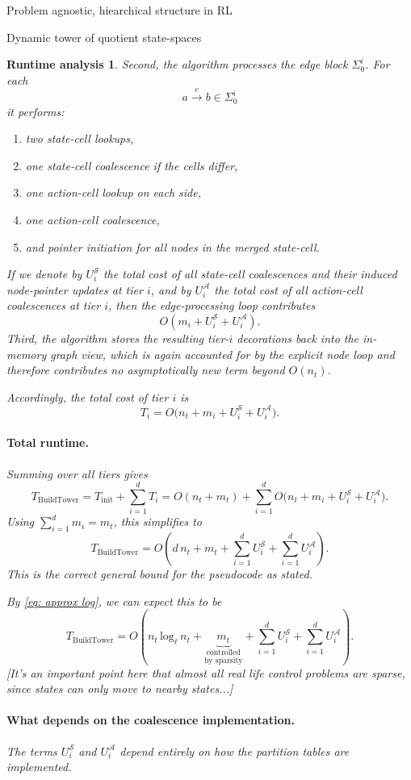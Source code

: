 \documentclass[11pt]{article}
\newtheorem{run_analysis}[subsubsection]{Runtime analysis}
\begin{document}
\begin{section}{Problem agnostic, hiearchical structure in RL}
\begin{subsection}{Dynamic tower of quotient state-spaces}
\begin{run_analysis}
Second, the algorithm processes the edge block $\Sigma_0^i$. For each
\[
a\xrightarrow{\ e\ }b\in\Sigma_0^i
\]
it performs:
\begin{enumerate}
    \item two state-cell lookups,
    \item one state-cell coalescence if the cells differ,
    \item one action-cell lookup on each side,
    \item one action-cell coalescence,
    \item and pointer initiation for all nodes in the merged state-cell.
\end{enumerate}
If we denote by
$
U_i^{\mathcal S}
$
the total cost of all state-cell coalescences and their induced node-pointer updates at tier $i$, and by
$
U_i^{\mathcal A}
$
the total cost of all action-cell coalescences at tier $i$, then the edge-processing loop contributes
\[
O(m_i + U_i^{\mathcal S}+U_i^{\mathcal A}).
\]
Third, the algorithm stores the resulting tier-$i$ decorations back into the in-memory graph view, which is again accounted for by the explicit node loop and therefore contributes no asymptotically new term beyond $O(n_t)$.

Accordingly, the total cost of tier $i$ is
\[
T_i = O\bigl(n_t + m_i + U_i^{\mathcal S}+U_i^{\mathcal A}\bigr).
\]

\paragraph{Total runtime.}
Summing over all tiers gives
\[
T_{\mathrm{BuildTower}}
=
T_{\mathrm{init}} + \sum_{i=1}^d T_i
=
O(n_t+m_t)
+
\sum_{i=1}^d O\bigl(n_t + m_i + U_i^{\mathcal S}+U_i^{\mathcal A}\bigr).
\]
Using $\sum_{i=1}^d m_i=m_t$, this simplifies to
\[
T_{\mathrm{BuildTower}}
=
O\!\left(
d\,n_t + m_t + \sum_{i=1}^d U_i^{\mathcal S} + \sum_{i=1}^d U_i^{\mathcal A}
\right).
\]
This is the correct general bound for the pseudocode as stated.

By \eqref{eq: approx log}, we can expect this to be
\[
T_{\mathrm{BuildTower}}
=
O\!\left(
n_t\,\text{log}_{\ell}\,n_{t} + 
\!\!\!\!\!
\underset{\text{by sparsity}}{\underset{\text{controlled}}{\underbrace{m_t}}}
 + \sum_{i=1}^d U_i^{\mathcal S} + \sum_{i=1}^d U_i^{\mathcal A}
\right).
\]
[It's an important point here that almost all real life control problems are sparse, since states can only move to nearby states...]

\paragraph{What depends on the coalescence implementation.}
The terms $
U_i^{\mathcal S}$ and 
$U_i^{\mathcal A}$ depend entirely on how the partition tables are implemented.


\end{run_analysis}
\end{subsection}
\end{section}
\end{document}
